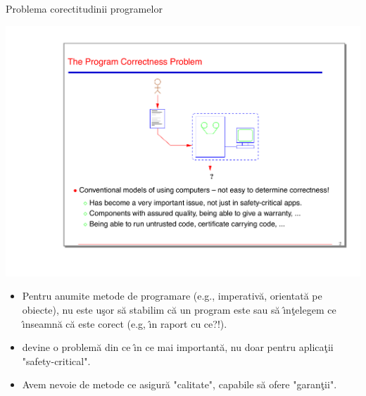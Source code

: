 \documentclass[xcolor=x11names,compress,10pt]{beamer}
\begin{document}
\begin{frame}{Problema corectitudinii programelor}
\vspace{.2cm}
\begin{center}
\includegraphics[scale=0.5]{img/imagine1}
\end{center}
\vspace{-.5cm}
\begin{itemize}
	\item Pentru anumite metode de programare (e.g., {\color{red} imperativ\u a, orientat\u a pe obiecte}), nu este u\c sor s\u a stabilim c\u a un program este  sau s\u a \^\i n\c telegem ce \^\i nseamn\u a c\u a este corect (e.g, \^\i n raport cu ce?!). 
	\item {} devine o problem\u a din ce \^\i n ce mai important\u a, nu doar pentru aplica\c tii "safety-critical".
	\item Avem nevoie de metode ce asigur\u a "calitate", capabile s\u a ofere "garan\c tii".
\end{itemize}
\end{frame}
\end{document}
